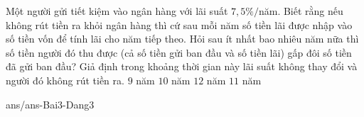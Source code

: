 \begin{ex}
	Một người gửi tiết kiệm vào ngân hàng với lãi suất $7{,}5\%/$năm. Biết rằng nếu không rút tiền ra khỏi ngân hàng thì cứ sau mỗi năm số tiền lãi được nhập vào số tiền vốn để tính lãi cho năm tiếp theo. Hỏi sau ít nhất bao nhiêu năm nữa thì số tiền người đó thu được (cả số tiền gửi ban đầu và số tiền lãi) gấp đôi số tiền đã gửi ban đầu? Giả định trong khoảng thời gian này lãi suất không thay đổi và người đó không rút tiền ra.
	\choice
	{$9$ năm}
	{\True $10$ năm}
	{$12$ năm}
	{$11$ năm}
\end{ex}
\begin{indapan}{10}
	{ans/ans-Bai3-Dang3}
\end{indapan}